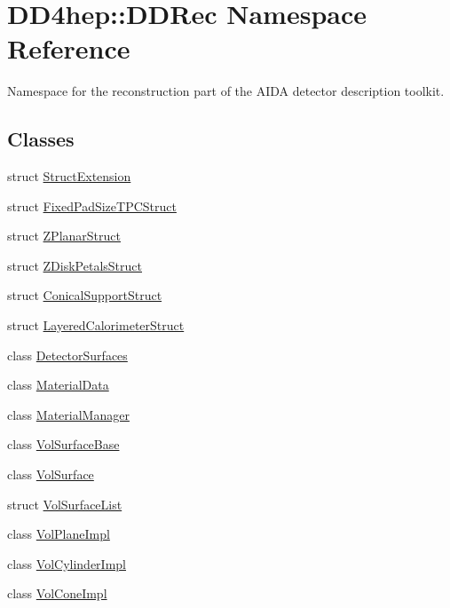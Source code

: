 \hypertarget{namespace_d_d4hep_1_1_d_d_rec}{
\section{DD4hep::DDRec Namespace Reference}
\label{namespace_d_d4hep_1_1_d_d_rec}
}


Namespace for the reconstruction part of the AIDA detector description toolkit.  
\subsection*{Classes}
\begin{DoxyCompactItemize}
\item 
struct \hyperlink{struct_d_d4hep_1_1_d_d_rec_1_1_struct_extension}{StructExtension}
\item 
struct \hyperlink{struct_d_d4hep_1_1_d_d_rec_1_1_fixed_pad_size_t_p_c_struct}{FixedPadSizeTPCStruct}
\item 
struct \hyperlink{struct_d_d4hep_1_1_d_d_rec_1_1_z_planar_struct}{ZPlanarStruct}
\item 
struct \hyperlink{struct_d_d4hep_1_1_d_d_rec_1_1_z_disk_petals_struct}{ZDiskPetalsStruct}
\item 
struct \hyperlink{struct_d_d4hep_1_1_d_d_rec_1_1_conical_support_struct}{ConicalSupportStruct}
\item 
struct \hyperlink{struct_d_d4hep_1_1_d_d_rec_1_1_layered_calorimeter_struct}{LayeredCalorimeterStruct}
\item 
class \hyperlink{class_d_d4hep_1_1_d_d_rec_1_1_detector_surfaces}{DetectorSurfaces}
\item 
class \hyperlink{class_d_d4hep_1_1_d_d_rec_1_1_material_data}{MaterialData}
\item 
class \hyperlink{class_d_d4hep_1_1_d_d_rec_1_1_material_manager}{MaterialManager}
\item 
class \hyperlink{class_d_d4hep_1_1_d_d_rec_1_1_vol_surface_base}{VolSurfaceBase}
\item 
class \hyperlink{class_d_d4hep_1_1_d_d_rec_1_1_vol_surface}{VolSurface}
\item 
struct \hyperlink{struct_d_d4hep_1_1_d_d_rec_1_1_vol_surface_list}{VolSurfaceList}
\item 
class \hyperlink{class_d_d4hep_1_1_d_d_rec_1_1_vol_plane_impl}{VolPlaneImpl}
\item 
class \hyperlink{class_d_d4hep_1_1_d_d_rec_1_1_vol_cylinder_impl}{VolCylinderImpl}
\item 
class \hyperlink{class_d_d4hep_1_1_d_d_rec_1_1_vol_cone_impl}{VolConeImpl}

\end{DoxyCompactItemize}
